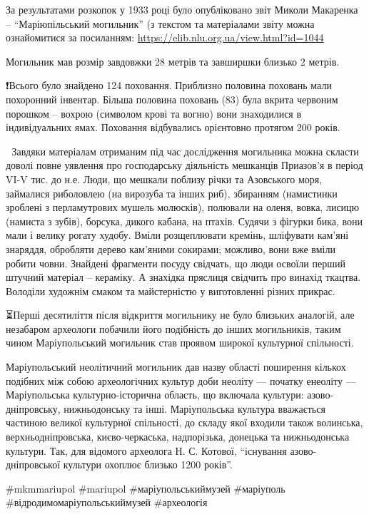 За результатами розкопок у 1933 році було опубліковано звіт Миколи Макаренка –
\enquote{Маріюпільський могильник} (з текстом та матеріалами звіту можна ознайомитися
за посиланням: \url{https://elib.nlu.org.ua/view.html?id=1044}

Могильник мав розмір завдовжки 28 метрів та завширшки близько 2 метрів. 

❗️Всього було знайдено 124 поховання. Приблизно половина поховань мали
похоронний інвентар. Більша половина поховань (83) була вкрита червоним
порошком – вохрою (символом крові та вогню) вони знаходилися в індивідуальних
ямах. Поховання відбувались орієнтовно протягом 200 років.

📖 Завдяки матеріалам отриманим під час дослідження могильника можна скласти
доволі повне уявлення про господарську діяльність мешканців Приазов'я в період
VI-V тис. до н.е. Люди, що мешкали поблизу річки та Азовського моря, займалися
риболовлею (на вирозуба та інших риб), збиранням (намистинки зроблені з
перламутрових мушель молюсків), полювали на оленя, вовка, лисицю (намиста з
зубів), борсука, дикого кабана, на птахів. Судячи з фігурки бика, вони мали і
велику рогату худобу. Вміли розщеплювати кремінь, шліфувати кам'яні знаряддя,
обробляти дерево кам'яними сокирами; можливо, вони вже вміли робити човни.
Знайдені фрагменти посуду свідчать, що люди освоїли перший штучний матеріал –
кераміку. А знахідка пряслиця свідчить про винахід ткацтва. Володіли художнім
смаком та майстерністю у виготовленні різних прикрас.

⏳️Перші десятиліття після відкриття могильнику не було близьких аналогій, але
незабаром археологи побачили його подібність до інших могильників, таким чином
Маріупольський могильник став проявом широкої культурної спільності.

Маріупольський неолітичний могильник дав назву області поширення кількох
подібних між собою археологічних культур доби неоліту — початку енеоліту —
Маріупольська культурно-історична область, що включала культури:
азово-дніпровську, нижньодонську та інші. Маріупольська культура вважається
частиною великої культурної спільності, до складу якої входили також волинська,
верхньодніпровська, києво-черкаська, надпорізька, донецька та нижньодонська
культури. Так, для відомого археолога Н. С. Котової, \enquote{існування
азово-дніпровської культури охоплює близько 1200 років}.

\#mkmmariupol \#mariupol \#маріупольськиймузей \#маріуполь \#відродимомаріупольськиймузей \#археологія
